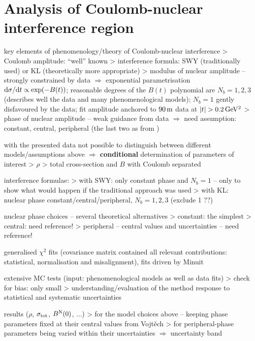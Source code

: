 \section{Analysis of Coulomb-nuclear interference region}
\label{sec:cni}

\> key elements of phenomenology/theory of Coulomb-nuclear interference
\>> Coulomb amplitude: ``well'' known
\>> interference formula: SWY (traditionally used) or KL (theoretically more appropriate)
\>> modulus of nuclear amplitude -- strongly constrained by data $\Rightarrow$ exponential parametrisation ${\rm d}\sigma / {\rm d} t \propto \exp( -B(t) )$; reasonable degrees of the $B(t)$ polynomial are $N_b = 1, 2, 3$ (describes well the data and many phenomenological models); $N_b = 1$ gently disfavoured by the data; fit amplitude anchored to $90\,{\rm m}$ data at $|t| > 0.2\,{\rm GeV^2}$
\>> phase of nuclear amplitude -- weak guidance from data $\Rightarrow$ need assumption: constant, central, peripheral (the last two as from \cite{kl94})

\> with the presented data not possible to distinguish between different models/assumptions above $\Rightarrow$ {\bf conditional} determination of parameters of interest
\>> $\rho$
\>> total cross-section and $B$ with Coulomb separated


\> interference formulae:
\>> with SWY: only constant phase and $N_b = 1$ -- only to show what would happen if the traditional approach was used
\>> with KL: nuclear phase constant/central/peripheral, $N_b = 1, 2, 3$ (exclude 1 ??)

\> nuclear phase choices -- several theoretical alternatives
\>> constant: the simplest
\>> central: need reference!
\>> peripheral -- central values and uncertainties -- need reference!


\> generalised $\chi^2$ fits (covariance matrix contained all relevant contributions: statistical, normalisation and misalignment), fits driven by Minuit

\> extensive MC tests (input: phenomenological models as well as data fits)
\>> check for bias: only small
\>> understanding/evaluation of the method response to statistical and systematic uncertainties

\> results ($\rho$, $\sigma_{\rm tot}$, $B^{\rm N}(0)$, ...)
\>> for the model choices above -- keeping phase parameters fixed at their central values from Vojt\v ech
\>> for peripheral-phase parameters being varied within their uncertainties $\Rightarrow$ uncertainty band

